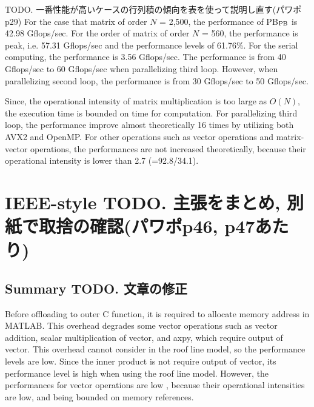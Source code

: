\documentclass{IOS-Book-Article}
\begin{document}
TODO. 一番性能が高いケースの行列積の傾向を表を使って説明し直す(パワポp29)
For the case that matrix of order $N$ = 2,500, the performance of PB$_{\rm{PB}}$ is 42.98 Gflops/sec.
For the order of matrix of order $N$ = 560, the performance is peak, i.e. 57.31 Gflops/sec and the performance levels of 61.76\%. For the serial computing, the performance is 3.56 Gflops/sec.
The performance is from 40 Gflops/sec to 60 Gflops/sec when parallelizing third loop. However, when parallelizing second loop, the performance is from 30 Gflops/sec to 50 Gflops/sec. 

Since, the operational intensity of matrix multiplication is too large as $O(N)$, the execution time is bounded on time for computation. For parallelizing third loop, the performance improve almost theoretically 16 times by utilizing both AVX2 and OpenMP.
For other operations such as vector operations and matrix-vector operations, the performances are not increased theoretically, because their operational intensity is lower than 2.7 (=92.8/34.1). %

\section{IEEE-style TODO. 主張をまとめ, 別紙で取捨の確認(パワポp46, p47あたり)}

\subsection{Summary TODO. 文章の修正}

Before offloading to outer C function, it is required to allocate memory address in MATLAB. This overhead degrades some vector operations such as vector addition, scalar multiplication of vector, and axpy, which require output of vector. This overhead cannot consider in the roof line model, so the performance levels are low. Since the inner product is not require output of vector, its performance level is high when using the roof line model. However, the performances for vector operations are low , because their operational intensities are low, and being bounded on memory references.
\end{document}
